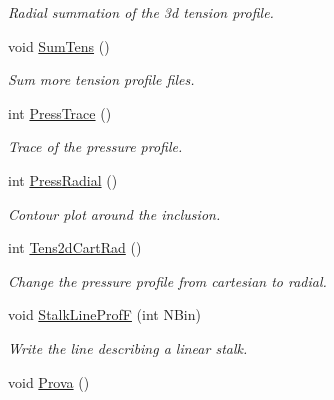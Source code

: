 \begin{DoxyCompactItemize}
\begin{DoxyCompactList}\small\item\em Radial summation of the 3d tension profile. \end{DoxyCompactList}\item 
void \hyperlink{classElPoly_a35c812e3cfa8e0031dc2b521e075c1c9}{Sum\+Tens} ()\hypertarget{classElPoly_a35c812e3cfa8e0031dc2b521e075c1c9}{}\label{classElPoly_a35c812e3cfa8e0031dc2b521e075c1c9}

\begin{DoxyCompactList}\small\item\em Sum more tension profile files. \end{DoxyCompactList}\item 
int \hyperlink{classElPoly_a534f27d79203f0b018acaedf41bbdb13}{Press\+Trace} ()\hypertarget{classElPoly_a534f27d79203f0b018acaedf41bbdb13}{}\label{classElPoly_a534f27d79203f0b018acaedf41bbdb13}

\begin{DoxyCompactList}\small\item\em Trace of the pressure profile. \end{DoxyCompactList}\item 
int \hyperlink{classElPoly_a17a99c936b16e1880291e6c3c5957e44}{Press\+Radial} ()\hypertarget{classElPoly_a17a99c936b16e1880291e6c3c5957e44}{}\label{classElPoly_a17a99c936b16e1880291e6c3c5957e44}

\begin{DoxyCompactList}\small\item\em Contour plot around the inclusion. \end{DoxyCompactList}\item 
int \hyperlink{classElPoly_a7282d2e3fe0a3ee0caa631363913cc0a}{Tens2d\+Cart\+Rad} ()\hypertarget{classElPoly_a7282d2e3fe0a3ee0caa631363913cc0a}{}\label{classElPoly_a7282d2e3fe0a3ee0caa631363913cc0a}

\begin{DoxyCompactList}\small\item\em Change the pressure profile from cartesian to radial. \end{DoxyCompactList}\item 
void \hyperlink{classElPoly_adbfe7fc41363f770eee9c2a9e0e1ed57}{Stalk\+Line\+ProfF} (int N\+Bin)
\begin{DoxyCompactList}\small\item\em Write the line describing a linear stalk. \end{DoxyCompactList}\item 
void \hyperlink{classElPoly_a47cedfc639fa29b9812167b4fb5d1360}{Prova} ()\hypertarget{classElPoly_a47cedfc639fa29b9812167b4fb5d1360}{}\label{classElPoly_a47cedfc639fa29b9812167b4fb5d1360}


\end{DoxyCompactItemize}
